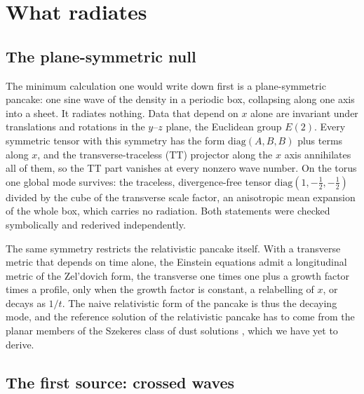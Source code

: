 \documentclass[aps,prd,twocolumn,10pt,superscriptaddress,nofootinbib,longbibliography,floatfix]{revtex4-2}
\begin{document}
\section{What radiates}\label{sec:problem}

\subsection{The plane-symmetric null}\label{sec:null}

The minimum calculation one would write down first is a plane-symmetric pancake: one sine wave of the density in a periodic box, collapsing along one axis into a sheet. It radiates nothing. Data that depend on $x$ alone are invariant under translations and rotations in the $y$--$z$ plane, the Euclidean group $E(2)$. Every symmetric tensor with this symmetry has the form $\mathrm{diag}(A,B,B)$ plus terms along $x$, and the transverse-traceless (TT) projector along the $x$ axis annihilates all of them, so the TT part vanishes at every nonzero wave number. On the torus one global mode survives: the traceless, divergence-free tensor $\mathrm{diag}(1,-\tfrac12,-\tfrac12)$ divided by the cube of the transverse scale factor, an anisotropic mean expansion of the whole box, which carries no radiation. Both statements were checked symbolically and rederived independently.

The same symmetry restricts the relativistic pancake itself. With a transverse metric that depends on time alone, the Einstein equations admit a longitudinal metric of the Zel'dovich form, the transverse one times one plus a growth factor times a profile, only when the growth factor is constant, a relabelling of $x$, or decays as $1/t$. The naive relativistic form of the pancake is thus the decaying mode, and the reference solution of the relativistic pancake has to come from the planar members of the Szekeres class of dust solutions \cite{Bolejko:2018silent}, which we have yet to derive.

\subsection{The first source: crossed waves}\label{sec:source}
\end{document}
